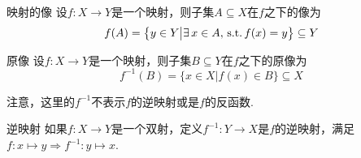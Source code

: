 \begin{definition}{映射的像}
    设$f:X\to Y$是一个映射，则子集$A\subseteq X$在$f$之下的像为
    \[f(A)=\big\{y\in Y\big|\exists\, x\in A,\,\operatorname{\text{s.t.}} f(x)=y \big\}\subseteq Y\]
\end{definition}

\begin{definition}{原像}
    设$f:X\to Y$是一个映射，则子集$B\subseteq Y$在$f$之下的原像为
    \[f^{-1}(B)=\big\{x\in X\big|f(x)\in B \big\}\subseteq X\]
\end{definition}

\begin{note}
    注意，这里的$f^{-1}$不表示$f$的逆映射或是$f$的反函数.
\end{note}

\begin{definition}{逆映射}
    如果$f:X\to Y$是一个双射，定义$f^{-1}:Y\to X$是$f$的逆映射，满足$f:x\mapsto y \Rightarrow f^{-1}:y\mapsto x$.
\end{definition}

\begin{definition}{}
    
\end{definition}